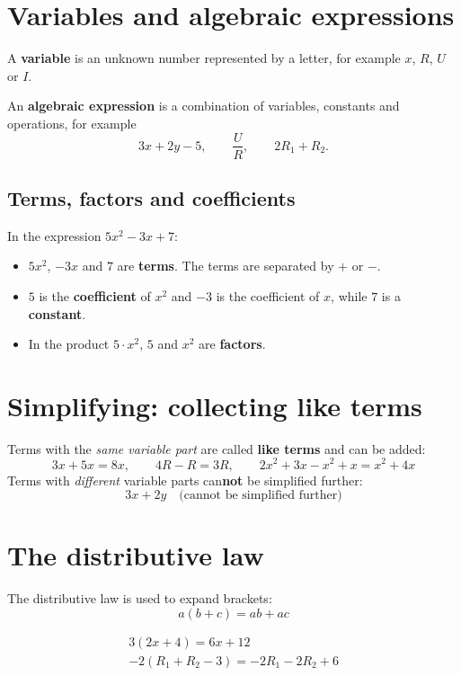 
\section{Variables and algebraic expressions}
\label{c2:sec:variabler}
A \textbf{variable} is an unknown number represented by a letter, for example $x$, $R$, $U$ or
$I$.

An \textbf{algebraic expression} is a combination of variables, constants and operations, for
example
\[
  3x + 2y - 5, \qquad \frac{U}{R}, \qquad 2R_1 + R_2.
\]

\subsection{Terms, factors and coefficients}
\label{c2:sec:termer}
In the expression $5x^2 - 3x + 7$:
\begin{itemize}
  \item $5x^2$, $-3x$ and $7$ are \textbf{terms}. The terms are separated by $+$ or $-$.
  \item $5$ is the \textbf{coefficient} of $x^2$ and $-3$ is the coefficient of $x$, while $7$ is
    a \textbf{constant}.
  \item In the product $5 \cdot x^2$, $5$ and $x^2$ are \textbf{factors}.
\end{itemize}

\section{Simplifying: collecting like terms}
\label{c2:sec:forenkling}
Terms with the \emph{same variable part} are called \textbf{like terms} and can be added:
\[
  3x + 5x = 8x, \qquad 4R - R = 3R, \qquad 2x^2 + 3x - x^2 + x = x^2 + 4x
\]
Terms with \emph{different} variable parts can\textbf{not} be simplified further:
\[
  3x + 2y \quad \text{(cannot be simplified further)}
\]

\section{The distributive law}
\label{c2:sec:distributiv}
The distributive law is used to expand brackets:
\[
  a(b + c) = ab + ac
\]

\begin{exempel}
\begin{gather*}
  3(2x + 4) = 6x + 12 \\
  -2(R_1 + R_2 - 3) = -2R_1 - 2R_2 + 6
\end{gather*}
\end{exempel}

